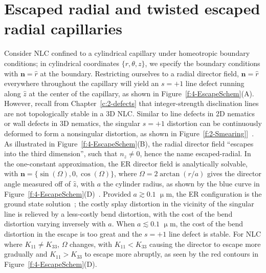 \section{Escaped radial and twisted escaped radial capillaries}
Consider NLC confined to a cylindrical capillary under homeotropic boundary conditions; in cylindrical coordinates $\{r,\theta,z\}$, we specify the boundary conditions with $\mathbf{n} = \hat{r}$ at the boundary.
Restricting ourselves to a radial director field, $\mathbf{n} = \hat{r}$ everywhere throughout the capillary will yield an $s = +1$ line defect running along $\hat{z}$ at the center of the capillary, as shown in Figure~\ref{f:4-EscapeSchem}(A).
However, recall from Chapter~\ref{c:2-defects} that integer-strength disclination lines are not topologically stable in a 3D NLC.
Similar to line defects in 2D nematics or wall defects in 3D nematics, the singular $s = +1$ distortion can be continuously deformed to form a nonsingular distortion, as shown in Figure~\ref{f:2-Smearing}]~\cite{RN179,RN290,RN289}.
As illustrated in Figure~\ref{f:4-EscapeSchem}(B), the radial director field ``escapes into the third dimension'', such that  $n_{z} \neq 0$, hence the name escaped-radial.
In the one-constant approximation, the ER director field is analytically solvable, with $\mathbf{n} = \{\sin(\Omega),0,\cos(\Omega)\}$, where $\Omega = 2 \arctan(r/a)$ gives the director angle measured off of $\hat{z}$, with $a$ the cylinder radius, as shown by the blue curve in Figure~\ref{f:4-EscapeSchem}(D)~\cite{RN179,RN290}.
Provided $a \gtrsim 0.1$ $\upmu$m, the ER configuration is the ground state solution~\cite{RN194}; the costly splay distortion in the vicinity of the singular line is relieved by a less-costly bend distortion, with the cost of the bend distortion varying inversely with $a$.
When $a \lesssim 0.1$ $\upmu$m, the cost of the bend distortion in the escape is too great and the $s = +1$ line defect is stable.
For NLC where $K_{11} \neq K_{33}$, $\Omega$ changes, with $K_{11} < K_{33}$ causing the director to escape more gradually and $K_{11} > K_{33}$ to escape more abruptly, as seen by the red contours in Figure~\ref{f:4-EscapeSchem}(D).
